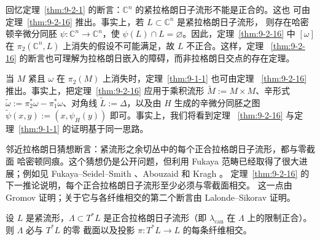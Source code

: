 回忆定理~\ref{thm:9-2-1} 的断言：$\mathbb C^n$ 的紧拉格朗日子流形不能是正合的。这也
可由定理~\ref{thm:9-2-16} 推出。事实上，若 $L\subset\mathbb C^n$ 是紧拉格朗日子流形，
则存在哈密顿辛微分同胚 $\psi:\mathbb C^n\to\mathbb C^n$，使
$\psi(L)\cap L=\varnothing$。因此，定理~\ref{thm:9-2-16} 中 $[\omega]$ 在
$\pi_2(\mathbb C^n,L)$ 上消失的假设不可能满足，故 $L$ 不正合。这样，定理
~\ref{thm:9-2-16} 的断言也可理解为拉格朗日嵌入的障碍，而非拉格朗日交点的存在定理。

当 $M$ 紧且 $\omega$ 在 $\pi_2(M)$ 上消失时，定理~\ref{thm:9-1-1} 也可由定理
~\ref{thm:9-2-16} 推出。事实上，把定理~\ref{thm:9-2-16} 应用于乘积流形
$\widetilde M:=M\times M$、辛形式
$\widetilde\omega:=\pi_2^*\omega-\pi_1^*\omega$、对角线
$\widetilde L:=\Delta$，以及由 $H$ 生成的辛微分同胚之图
$\widetilde\psi(x,y):=(x,\psi_H(y))$ 即可。事实上，我们将看到定理
~\ref{thm:9-2-16} 与定理~\ref{thm:9-1-1} 的证明基于同一思路。

邻近拉格朗日猜想断言：紧流形之余切丛中的每个正合拉格朗日子流形，都与零截面
哈密顿同痕。这个猜想仍是公开问题，但利用 Fukaya 范畴已经取得了很大进展；例如见
Fukaya--Seidel--Smith 、Abouzaid  和 Kragh 。
定理~\ref{thm:9-2-16} 的下一推论说明，每个正合拉格朗日子流形至少必须与零截面相交。
这一点由 Gromov  证明；关于它与各纤维相交的第二个断言由
Lalonde--Sikorav  证明。

\begin{corollary}\label{cor:9-2-17}
设 $L$ 是紧流形，$\Lambda\subset T^*L$ 是正合拉格朗日子流形（即
$\lambda_{\mathrm{can}}$ 在 $\Lambda$ 上的限制正合）。则 $\Lambda$ 必与 $T^*L$ 的零
截面以及投影 $\pi:T^*L\to L$ 的每条纤维相交。
\end{corollary}

